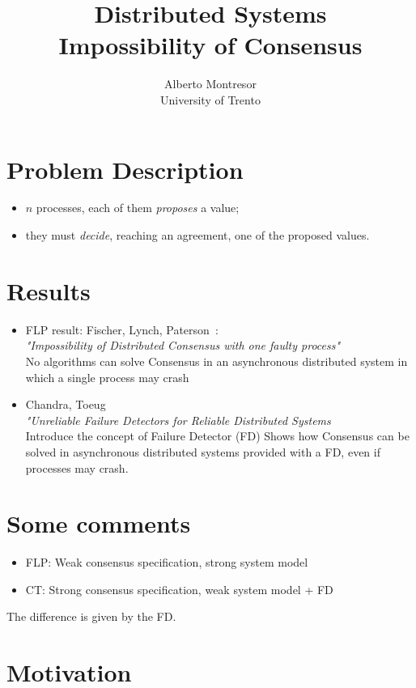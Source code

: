 \documentclass[12pt]{article}
\newcommand{\BI}{\begin{itemize}}
\newcommand{\EI}{\end{itemize}}
\begin{document}
 

\title{Distributed Systems\\Impossibility of Consensus}
\author{Alberto Montresor\\University of Trento}
\maketitle

\section*{Problem Description}

\BI
\item $n$ processes, each of them {\em proposes} a value;
\item they must {\em decide}, reaching an agreement, one of
  the proposed values.
\EI

\section*{Results}

\BI
\item FLP result: Fischer, Lynch, Paterson~\cite{flp85}: \\
  {\em "Impossibility of Distributed Consensus with one faulty process"} \\
  No algorithms can solve Consensus in an asynchronous distributed
  system in which a single process may crash
  
\item Chandra, Toeug~\cite{ct96} \\
  {\em "Unreliable Failure Detectors for Reliable Distributed Systems} \\
  Introduce the concept of Failure Detector (FD)
  Shows how Consensus can be solved in asynchronous distributed systems
  provided with a FD, even if processes may crash.
\EI

\section*{Some comments}

\BI
\item FLP: Weak consensus specification, strong system model
\item CT: Strong consensus specification, weak system model + FD
\EI
The difference is given by the FD.

\section*{Motivation}
\end{document}
